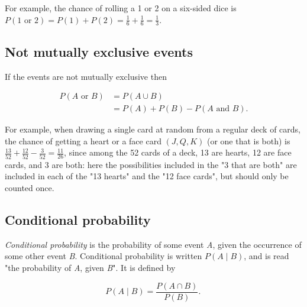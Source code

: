 For example, the chance of rolling a 1 or 2 on a six-sided dice is $P(1\text{ or }2) =
P(1) + P(2) = \tfrac{1}{6} + \tfrac{1}{6} = \tfrac{1}{3}.$




\subsection{Not mutually exclusive events}
\label{sss:notm-a5cc}




If the events are not mutually exclusive then



\begin{align} P\left(A \text{ or } B\right) &= P(A \cup B) \\ &= P\left(A\right) + P\left(B\right) - P\left(A \text{ and } B\right). \end{align}



For example, when drawing a single card at random from a regular deck of cards, the chance
of getting a heart or a face card $(J,Q,K)$ (or one that is both) is $\tfrac{13}{52} +
\tfrac{12}{52} - \tfrac{3}{52} = \tfrac{11}{26}$, since among the 52 cards of a deck, 13
are hearts, 12 are face cards, and 3 are both: here the possibilities included in the "3
that are both" are included in each of the "13 hearts" and the "12 face cards", but should
only be counted once.




\subsection{Conditional probability}
\label{sss:cond-bd32}




\textit{Conditional probability} is the probability of some event \textit{A}, given the occurrence of some other event \textit{B}. Conditional probability is written $P(A \mid B)$, and is read "the probability of \textit{A}, given \textit{B}". It is defined by



$$P(A \mid B) = \frac{P(A \cap B)}{P(B)}.\,$$



